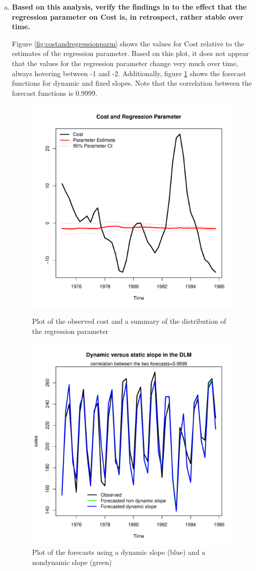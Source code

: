 \documentclass{article}
\begin{document}
\begin{enumerate}[(a)]
		\item \textbf{Based on this analysis, verify the findings in \cite{WHP1987b} to the effect that the regression parameter on Cost is, in retrospect, rather stable over time.}
		
		Figure \ref{fig:costandregressionparm} shows the values for Cost relative to the estimates of the regression parameter. Based on this plot, it does not appear that the values for the regression parameter change very much over time, always hovering between -1 and -2. Additionally, figure \ref{fig:dynvsstatic} shows the forecast functions for dynamic and fixed slopes. Note that the correlation between the forecast functions is 0.9999.
		
		\begin{figure}
			\begin{minipage}{0.45\linewidth}
				\centering
				\includegraphics[width=0.7\linewidth]{CostandRegressionParm}
				\caption{Plot of the observed cost and a summary of the distribution of the regression parameter}
				\label{fig:costandregressionparm}
			\end{minipage}
			\hfill
			\begin{minipage}{0.45\linewidth}
				\centering
				\includegraphics[width=0.7\linewidth]{DynVsStaticSlope}
				\caption{Plot of the forecasts using a dynamic slope (blue) and a nondynamic slope (green)}
				\label{fig:dynvsstatic}
			\end{minipage}
			

\end{figure}
\end{enumerate}
\end{document}
